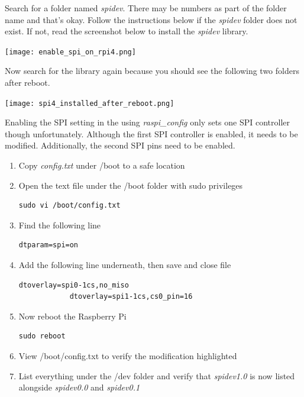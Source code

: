 \documentclass[journal]{IEEEtran}
\begin{document}
    Search for a folder named \emph{spidev}.
    There may be numbers as part of the folder name and that's okay.
    Follow the instructions below if the \emph{spidev} folder does not exist.
    If not, read the screenshot below to install the \emph{spidev} library.

    \texttt{[image: enable\_spi\_on\_rpi4.png]}

    Now search for the library again because you should see the following two folders after reboot.

    \texttt{[image: spi4\_installed\_after\_reboot.png]}

    Enabling the SPI setting in the using \emph{raspi\_config} only sets one SPI controller though unfortunately. 
    Although the first SPI controller is enabled, it needs to be modified.
    Additionally, the second SPI pins need to be enabled.
    
    \begin{enumerate}
        \item Copy \emph{config.txt} under /boot to a safe location
        \item Open the text file under the /boot folder with sudo privileges
        
        \begin{lstlisting}[frame=single, basicstyle=\ttfamily\footnotesize, breaklines=true]
            sudo vi /boot/config.txt
        \end{lstlisting}

        \item Find the following line
        
        \begin{lstlisting}[frame=single, basicstyle=\ttfamily\footnotesize, breaklines=true]
            dtparam=spi=on
        \end{lstlisting}

        \item Add the following line underneath, then save and close file
        
        \begin{lstlisting}[frame=single, basicstyle=\ttfamily\footnotesize, breaklines=true]
            dtoverlay=spi0-1cs,no_miso
            dtoverlay=spi1-1cs,cs0_pin=16
        \end{lstlisting}

        \item Now reboot the Raspberry Pi
        
        \begin{lstlisting}[frame=single, basicstyle=\ttfamily\footnotesize, breaklines=true]
            sudo reboot
        \end{lstlisting}

        \item View /boot/config.txt to verify the modification highlighted
        \item List everything under the /dev folder and verify that \emph{spidev1.0} is now listed alongside \emph{spidev0.0} and \emph{spidev0.1}
    \end{enumerate}
\end{document}

